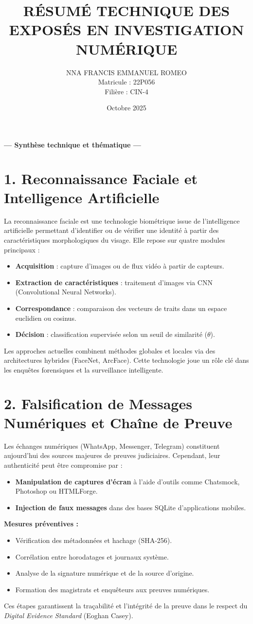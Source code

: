 \documentclass[12pt,a4paper]{article}
\title{\textbf{RÉSUMÉ TECHNIQUE DES EXPOSÉS EN INVESTIGATION NUMÉRIQUE}}
\author{NNA FRANCIS EMMANUEL ROMEO \\ Matricule : 22P056 \\ Filière : CIN-4}
\date{Octobre 2025}
\begin{document}
\maketitle
\thispagestyle{empty}
\begin{center}
\textbf{--- Synthèse technique et thématique ---}
\end{center}

\section*{1. Reconnaissance Faciale et Intelligence Artificielle}
La reconnaissance faciale est une technologie biométrique issue de l’intelligence artificielle permettant d’identifier ou de vérifier une identité à partir des caractéristiques morphologiques du visage. Elle repose sur quatre modules principaux :
\begin{itemize}[noitemsep]
  \item \textbf{Acquisition} : capture d’images ou de flux vidéo à partir de capteurs.
  \item \textbf{Extraction de caractéristiques} : traitement d’images via CNN (Convolutional Neural Networks).
  \item \textbf{Correspondance} : comparaison des vecteurs de traits dans un espace euclidien ou cosinus.
  \item \textbf{Décision} : classification supervisée selon un seuil de similarité ($\theta$).
\end{itemize}
Les approches actuelles combinent méthodes globales et locales via des architectures hybrides (FaceNet, ArcFace). Cette technologie joue un rôle clé dans les enquêtes forensiques et la surveillance intelligente.

\bigskip
\section*{2. Falsification de Messages Numériques et Chaîne de Preuve}
Les échanges numériques (WhatsApp, Messenger, Telegram) constituent aujourd’hui des sources majeures de preuves judiciaires. Cependant, leur authenticité peut être compromise par :
\begin{itemize}[noitemsep]
  \item \textbf{Manipulation de captures d’écran} à l’aide d’outils comme Chatsmock, Photoshop ou HTMLForge.
  \item \textbf{Injection de faux messages} dans des bases SQLite d’applications mobiles.
\end{itemize}
\textbf{Mesures préventives :}
\begin{itemize}[noitemsep]
  \item Vérification des métadonnées et hachage (SHA-256).
  \item Corrélation entre horodatages et journaux système.
  \item Analyse de la signature numérique et de la source d’origine.
  \item Formation des magistrats et enquêteurs aux preuves numériques.
\end{itemize}
Ces étapes garantissent la traçabilité et l’intégrité de la preuve dans le respect du \textit{Digital Evidence Standard} (Eoghan Casey).
\end{document}
